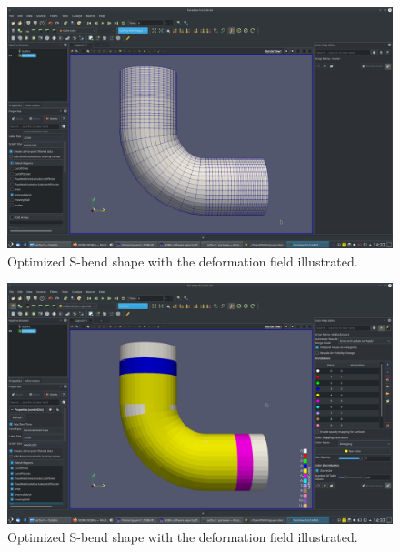 \documentclass[onsided]{book}
\numberwithin{equation}{section}
\begin{document}
\begin{enumerate}
    \begin{figure}[H]
        \centering
        \includegraphics[height=0.44\textheight]{airDuct_Solid_Color_Surface_with_Edges}
        \caption{Optimized S-bend shape with the deformation field illustrated.}
    \end{figure}

    \begin{figure}[H]
        \centering
        \includegraphics[height=0.44\textheight]{airDuct_vtkBlockColors_partial_Surface}
        \caption{Optimized S-bend shape with the deformation field illustrated.}
    \end{figure}
    

\end{enumerate}
\end{document}

